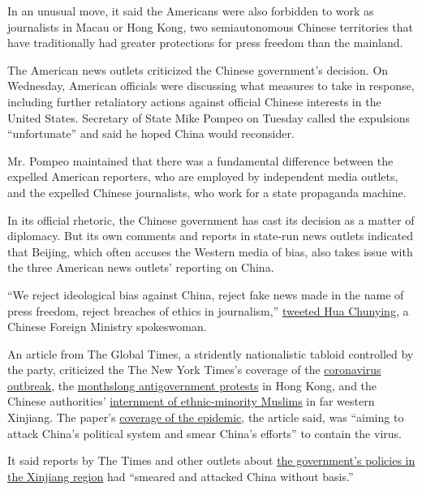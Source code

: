 In an unusual move, it said the Americans were also forbidden to work as
journalists in Macau or Hong Kong, two semiautonomous Chinese
territories that have traditionally had greater protections for press
freedom than the mainland.

The American news outlets criticized the Chinese government's decision.
On Wednesday, American officials were discussing what measures to take
in response, including further retaliatory actions against official
Chinese interests in the United States. Secretary of State Mike Pompeo
on Tuesday called the expulsions ``unfortunate'' and said he hoped China
would reconsider.

Mr. Pompeo maintained that there was a fundamental difference between
the expelled American reporters, who are employed by independent media
outlets, and the expelled Chinese journalists, who work for a state
propaganda machine.

In its official rhetoric, the Chinese government has cast its decision
as a matter of diplomacy. But its own comments and reports in state-run
news outlets indicated that Beijing, which often accuses the Western
media of bias, also takes issue with the three American news outlets'
reporting on China.

``We reject ideological bias against China, reject fake news made in the
name of press freedom, reject breaches of ethics in journalism,''
\href{https://twitter.com/SpokespersonCHN/status/1240067426684788736}{tweeted
Hua Chunying}, a Chinese Foreign Ministry spokeswoman.

An article from The Global Times, a stridently nationalistic tabloid
controlled by the party, criticized the The New York Times's coverage of
the
\href{https://www.nytimes.com/2020/03/07/world/asia/china-coronavirus-cost.html}{coronavirus
outbreak}, the
\href{https://www.nytimes.com/2019/12/07/world/asia/hong-kong-protests-us-chamber-commerce.html}{monthslong
antigovernment protests} in Hong Kong, and the Chinese authorities'
\href{https://www.nytimes.com/interactive/2019/11/16/world/asia/china-xinjiang-documents.html}{internment
of ethnic-minority Muslims} in far western Xinjiang. The paper's
\href{https://www.nytimes.com/2020/02/01/world/asia/china-coronavirus.html}{coverage
of the epidemic}, the article said, was ``aiming to attack China's
political system and smear China's efforts'' to contain the virus.

It said reports by The Times and other outlets about
\href{https://www.nytimes.com/2019/11/24/world/asia/leak-chinas-internment-camps.html}{the
government's policies in the Xinjiang region} had ``smeared and attacked
China without basis.''

